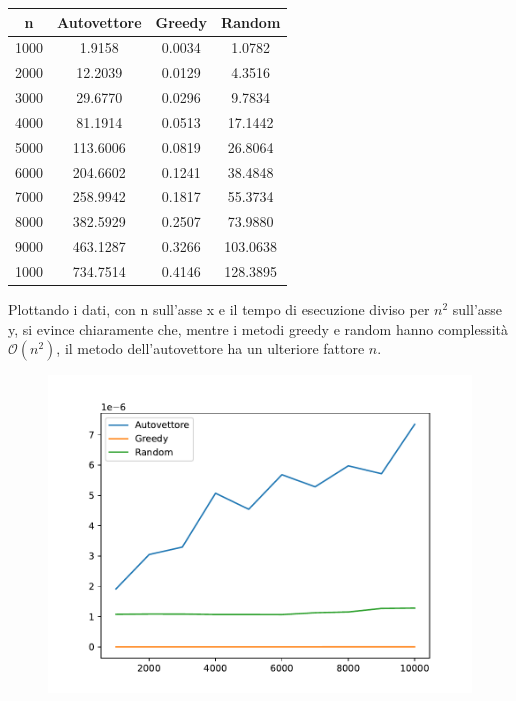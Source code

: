 \documentclass{article}
\begin{document}
\begin{center}
    \begin{tabular}{|c|c|c|c|}
        \hline
        n & Autovettore & Greedy & Random \\
        \hline
        \hline
        1000 & 1.9158 & 0.0034 & 1.0782 \\
        2000 & 12.2039 & 0.0129 & 4.3516 \\
        3000 & 29.6770 & 0.0296 & 9.7834 \\
        4000 & 81.1914 & 0.0513 & 17.1442 \\
        5000 & 113.6006 & 0.0819 & 26.8064 \\
        6000 & 204.6602 & 0.1241 & 38.4848 \\
        7000 & 258.9942 & 0.1817 & 55.3734 \\
        8000 & 382.5929 & 0.2507 & 73.9880 \\
        9000 & 463.1287 & 0.3266 & 103.0638 \\
        1000 & 734.7514 & 0.4146 & 128.3895 \\
        \hline

    \end{tabular}
\end{center}

Plottando i dati, con n sull'asse x e il tempo di esecuzione diviso per $n^2$ sull'asse y, si evince chiaramente che, mentre i metodi greedy e random hanno complessit\`a $\mathcal{O}(n^2)$, il metodo dell'autovettore ha un ulteriore fattore $n$.

\begin{figure}[H]
    \centering
    \includegraphics[width=0.7\linewidth]{complexity_plot.pdf}
\end{figure}
\end{document}
